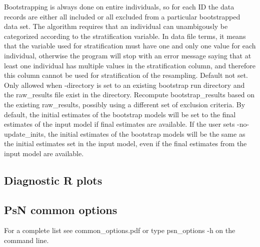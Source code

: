 \begin{optionlist}
Bootstrapping is always done on entire individuals, so for each ID the data records are either all included or all excluded from a particular bootstrapped data set. The algorithm requires that an individual can unambigously be categorized according to the stratification variable. In data file terms, it means that the variable used for stratification must have one and only one value for each individual, otherwise the program will stop with an error message saying that at least one individual 
has multiple values in the stratification column, and therefore this column cannot be used for stratification of the resampling.
\nextopt
{}
Default not set. Only allowed when -directory is set to an existing bootstrap run directory and
the raw\_results file exist in the directory. Recompute bootstrap\_results based on the existing raw\_results, possibly using a different set of exclusion criteria.
\nextopt
{}
By default, the initial estimates of the bootstrap models will be set to the final estimates of the input model if final estimates are available. If the user sets -no-update\_inits, the initial estimates of the bootstrap models will be the same as the initial estimates set in the input model, even if the final estimates from the input model are available.
\nextopt
\end{optionlist}

\subsection{Diagnostic R plots}
\newcommand{\rplotsconditions}{
See section Output, subsections Basic and Extended R plots,
for descriptions of the default bootstrap R plots.
The default bootstrap template 
requires the xpose4 R library of at least version 4.5.0,
and that R libraries ggplot2, plyr, dplyr are installed.
If the conditions are not fulfilled then no pdf will be generated,
see the .Rout file in the main run directory for error messages.
}


\subsection{PsN common options}
For a complete list see common\_options.pdf or type psn\_options -h on the command line.


